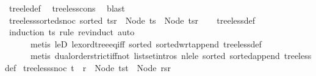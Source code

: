 \begin{isabellebody}
%
\isatagproof
{}\isamarkupfalse%
\ tree{\isacharunderscore}{\kern0pt}le{\isacharunderscore}{\kern0pt}def\ \isamarkupfalse%
\ tree{\isacharunderscore}{\kern0pt}less{\isacharunderscore}{\kern0pt}cons{}\ \isamarkupfalse%
\ blast%
\endisatagproof
{\isafoldproof}%
%
\isadelimproof
\isanewline
%
\endisadelimproof
\isanewline
{}\isamarkupfalse%
\ tree{\isacharunderscore}{\kern0pt}less{\isacharunderscore}{\kern0pt}sorted{\isacharunderscore}{\kern0pt}snoc{\isacharcolon}{\kern0pt}\ {\isachardoublequoteopen}sorted\ {\isacharparenleft}{\kern0pt}ts{\isacharat}{\kern0pt}{\isacharbrackleft}{\kern0pt}r{\isacharbrackright}{\kern0pt}{\isacharparenright}{\kern0pt}\ {\isasymLongrightarrow}\ Node\ ts\ {\isacharless}{\kern0pt}\ Node\ {\isacharparenleft}{\kern0pt}ts{\isacharat}{\kern0pt}{\isacharbrackleft}{\kern0pt}r{\isacharbrackright}{\kern0pt}{\isacharparenright}{\kern0pt}{\isachardoublequoteclose}\isanewline
%
\isadelimproof
\ \ %
\endisadelimproof
%
\isatagproof
{}\isamarkupfalse%
\ tree{\isacharunderscore}{\kern0pt}less{\isacharunderscore}{\kern0pt}def\ \isamarkupfalse%
\ {\isacharparenleft}{\kern0pt}induction\ ts\ rule{\isacharcolon}{\kern0pt}\ rev{\isacharunderscore}{\kern0pt}induct{\isacharcomma}{\kern0pt}\ auto{\isacharcomma}{\kern0pt}\isanewline
\ \ \ \ \ \ metis\ leD\ lexord{\isacharunderscore}{\kern0pt}tree{\isacharunderscore}{\kern0pt}eq{\isacharunderscore}{\kern0pt}iff\ sorted{}\ sorted{\isacharunderscore}{\kern0pt}wrt{\isacharunderscore}{\kern0pt}append\ tree{\isacharunderscore}{\kern0pt}less{\isacharunderscore}{\kern0pt}def{\isacharcomma}{\kern0pt}\isanewline
\ \ \ \ \ \ metis\ dual{\isacharunderscore}{\kern0pt}order{\isachardot}{\kern0pt}strict{\isacharunderscore}{\kern0pt}iff{\isacharunderscore}{\kern0pt}not\ list{\isachardot}{\kern0pt}set{\isacharunderscore}{\kern0pt}intros{\isacharparenleft}{\kern0pt}{}{\isacharparenright}{\kern0pt}\ nle{\isacharunderscore}{\kern0pt}le\ sorted{}\ sorted{\isacharunderscore}{\kern0pt}append\ tree{\isacharunderscore}{\kern0pt}less{\isacharunderscore}{\kern0pt}def{\isacharparenright}{\kern0pt}%
\endisatagproof
{\isafoldproof}%
%
\isadelimproof
\isanewline
%
\endisadelimproof
\isanewline
{}\isamarkupfalse%
\ tree{\isacharunderscore}{\kern0pt}less{\isacharunderscore}{\kern0pt}snoc{}{\isacharcolon}{\kern0pt}\ {\isachardoublequoteopen}t\ {\isacharless}{\kern0pt}\ r\ {\isasymLongrightarrow}\ Node\ {\isacharparenleft}{\kern0pt}ts{\isacharat}{\kern0pt}{\isacharbrackleft}{\kern0pt}t{\isacharbrackright}{\kern0pt}{\isacharparenright}{\kern0pt}\ {\isacharless}{\kern0pt}\ Node\ {\isacharparenleft}{\kern0pt}rs{\isacharat}{\kern0pt}{\isacharbrackleft}{\kern0pt}r{\isacharbrackright}{\kern0pt}{\isacharparenright}{\kern0pt}{\isachardoublequoteclose}\isanewline

\end{isabellebody}
